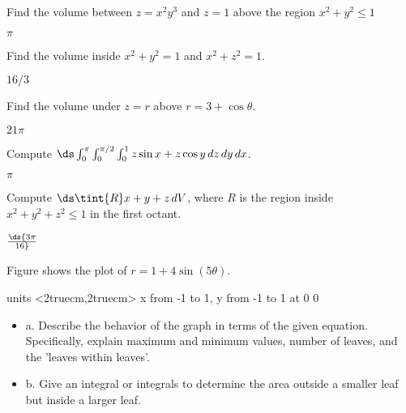 \begin{exercises}
\begin{exercise} Find the volume between
$z=x^2y^3$ and $z=1$ above
the region $x^2+y^2\le 1$
\begin{answer} $\pi$
\end{answer}\end{exercise}

\begin{exercise} Find the volume inside
$x^2+y^2=1$ and $x^2+z^2=1$.
\begin{answer} $16/3$
\end{answer}\end{exercise}


\begin{exercise} Find the volume under $z=r$ above $r=3+\cos\theta$.
\begin{answer} $21\pi$
\end{answer}\end{exercise}

\begin{exercise} Compute $\ds
\int_0^\pi\int_0^{\pi/2}\int_0^1 z\sin x+z\cos y\,dz\,dy\,dx$.
\begin{answer} $\pi$
\end{answer}\end{exercise}

\begin{exercise} Compute $\ds
\tint{R} x+y+z\,dV$, where $R$ is the region inside
$x^2+y^2+z^2\le 1$ in the first octant.
\begin{answer} $\ds {3\pi\over16}$
\end{answer}\end{exercise}

\begin{exercise} Figure  shows the plot of
$r=1+4\sin(5\theta)$.

\figure
\vbox{\beginpicture
\normalgraphs
\ninepoint
\setcoordinatesystem units <2truecm,2truecm>
\setplotarea x from -1 to 1, y from -1 to 1
 at 0 0
\endpicture}

\begin{itemize} %

\item{a.} Describe the behavior of the graph in terms of the given
  equation.  Specifically, explain maximum and minimum values, number
  of leaves, and the 'leaves within leaves'.
 
\item{b.} Give an integral or integrals to determine the area outside a
  smaller leaf but inside a larger leaf.



\end{itemize}
\end{exercise}
\end{exercises}
